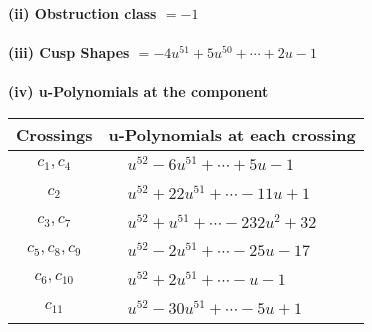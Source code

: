 \documentclass[1p]{elsarticle_modified}
\theoremstyle{definition}
\begin{document}
\flushleft \textbf{(ii) Obstruction class $= -1$}\\~\\
\flushleft \textbf{(iii) Cusp Shapes $= -4 u^{51}+5 u^{50}+\cdots+2 u-1$}\\~\\
\newpage\renewcommand{\arraystretch}{1}
\flushleft \textbf{(iv) u-Polynomials at the component}\newline \\
\begin{tabular}{m{50pt}|m{274pt}}
Crossings & \hspace{64pt}u-Polynomials at each crossing \\
\hline $$\begin{aligned}c_{1},c_{4}\end{aligned}$$&$\begin{aligned}
&u^{52}-6 u^{51}+\cdots+5 u-1
\end{aligned}$\\
\hline $$\begin{aligned}c_{2}\end{aligned}$$&$\begin{aligned}
&u^{52}+22 u^{51}+\cdots-11 u+1
\end{aligned}$\\
\hline $$\begin{aligned}c_{3},c_{7}\end{aligned}$$&$\begin{aligned}
&u^{52}+u^{51}+\cdots-232 u^2+32
\end{aligned}$\\
\hline $$\begin{aligned}c_{5},c_{8},c_{9}\end{aligned}$$&$\begin{aligned}
&u^{52}-2 u^{51}+\cdots-25 u-17
\end{aligned}$\\
\hline $$\begin{aligned}c_{6},c_{10}\end{aligned}$$&$\begin{aligned}
&u^{52}+2 u^{51}+\cdots- u-1
\end{aligned}$\\
\hline $$\begin{aligned}c_{11}\end{aligned}$$&$\begin{aligned}
&u^{52}-30 u^{51}+\cdots-5 u+1
\end{aligned}$\\
\hline
\end{tabular}\\~\\
\end{document}
